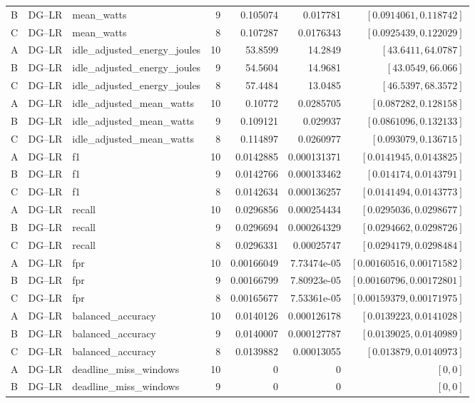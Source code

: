 \begin{longtable}{lllrrrr}
B & DG--LR & mean\_watts & 9 & 0.105074 & 0.017781 & $[0.0914061,0.118742]$\\
C & DG--LR & mean\_watts & 8 & 0.107287 & 0.0176343 & $[0.0925439,0.122029]$\\
A & DG--LR & idle\_adjusted\_energy\_joules & 10 & 53.8599 & 14.2849 & $[43.6411,64.0787]$\\
B & DG--LR & idle\_adjusted\_energy\_joules & 9 & 54.5604 & 14.9681 & $[43.0549,66.066]$\\
C & DG--LR & idle\_adjusted\_energy\_joules & 8 & 57.4484 & 13.0485 & $[46.5397,68.3572]$\\
A & DG--LR & idle\_adjusted\_mean\_watts & 10 & 0.10772 & 0.0285705 & $[0.087282,0.128158]$\\
B & DG--LR & idle\_adjusted\_mean\_watts & 9 & 0.109121 & 0.029937 & $[0.0861096,0.132133]$\\
C & DG--LR & idle\_adjusted\_mean\_watts & 8 & 0.114897 & 0.0260977 & $[0.093079,0.136715]$\\
A & DG--LR & f1 & 10 & 0.0142885 & 0.000131371 & $[0.0141945,0.0143825]$\\
B & DG--LR & f1 & 9 & 0.0142766 & 0.000133462 & $[0.014174,0.0143791]$\\
C & DG--LR & f1 & 8 & 0.0142634 & 0.000136257 & $[0.0141494,0.0143773]$\\
A & DG--LR & recall & 10 & 0.0296856 & 0.000254434 & $[0.0295036,0.0298677]$\\
B & DG--LR & recall & 9 & 0.0296694 & 0.000264329 & $[0.0294662,0.0298726]$\\
C & DG--LR & recall & 8 & 0.0296331 & 0.00025747 & $[0.0294179,0.0298484]$\\
A & DG--LR & fpr & 10 & 0.00166049 & 7.73474e-05 & $[0.00160516,0.00171582]$\\
B & DG--LR & fpr & 9 & 0.00166799 & 7.80923e-05 & $[0.00160796,0.00172801]$\\
C & DG--LR & fpr & 8 & 0.00165677 & 7.53361e-05 & $[0.00159379,0.00171975]$\\
A & DG--LR & balanced\_accuracy & 10 & 0.0140126 & 0.000126178 & $[0.0139223,0.0141028]$\\
B & DG--LR & balanced\_accuracy & 9 & 0.0140007 & 0.000127787 & $[0.0139025,0.0140989]$\\
C & DG--LR & balanced\_accuracy & 8 & 0.0139882 & 0.00013055 & $[0.013879,0.0140973]$\\
A & DG--LR & deadline\_miss\_windows & 10 & 0 & 0 & $[0,0]$\\
B & DG--LR & deadline\_miss\_windows & 9 & 0 & 0 & $[0,0]$\\

\end{longtable}
